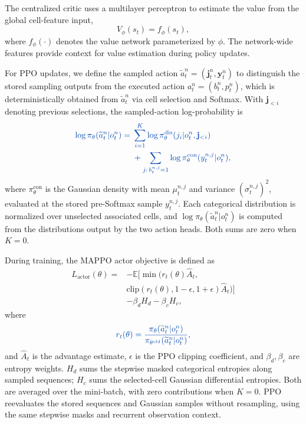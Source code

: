 \documentclass[journal]{IEEEtran}
\newcommand{\revbegin}[1]{\color{revisionblue}\ignorespaces}
\newcommand{\revend}[1]{\color{black}\ignorespaces}
\begin{document}
\revbegin{}The centralized critic uses a multilayer perceptron to estimate the value from the global cell-feature input,\revend{}
\begin{equation}
V_\phi(s_t)=f_\phi(s_t),
\end{equation}
\revbegin{}where $f_\phi(\cdot)$ denotes the value network parameterized by $\phi$. The network-wide features provide context for value estimation during policy updates.\revend{}

\revbegin{}For PPO updates, we define the sampled action $\widetilde a_t^n=(\mathbf j_t^n,\mathbf y_t^n)$ to distinguish the stored sampling outputs from the executed action $a_t^n=(b_t^n,p_t^n)$, which is deterministically obtained from $\widetilde a_t^n$ via cell selection and Softmax. With $\mathbf j_{<i}$ denoting previous selections, the sampled-action log-probability is\revend{}
\begin{equation}\color{revisionblue}
\begin{aligned}
\log\pi_{\theta}(\widetilde a_t^n|o_t^n)
={}&\sum_{i=1}^{K}\log\pi_{\theta}^{\mathrm{dis}}(j_i|o_t^n,\mathbf j_{<i})\\
&+\sum_{j:\,b_t^{n,j}=1}\log\pi_{\theta}^{\mathrm{con}}(y_t^{n,j}|o_t^n),
\end{aligned}
\label{eq:mappo-joint-logprob}
\end{equation}
\revbegin{}where $\pi_{\theta}^{\mathrm{con}}$ is the Gaussian density with mean $\mu_t^{n,j}$ and variance $(\sigma_t^{n,j})^2$, evaluated at the stored pre-Softmax sample $y_t^{n,j}$. Each categorical distribution is normalized over unselected associated cells, and $\log\pi_{\theta}(\widetilde a_t^n|o_t^n)$ is computed from the distributions output by the two action heads. Both sums are zero when $K=0$.\revend{}

During training, the MAPPO actor objective is defined as
\begin{equation}
\begin{aligned}
L_{\mathrm{actor}}(\theta)={}&-\mathbb E\Big[
\min\big(r_t(\theta)\hat A_t,\\
&\mathrm{clip}(r_t(\theta),1-\epsilon,1+\epsilon)\hat A_t\big)
\Big]\\
&-\beta_d H_d-\beta_c H_c,
\end{aligned}
\label{eq:mappo-actor-loss}
\end{equation}
where
\begin{equation}\color{revisionblue}
r_t(\theta)=
\frac{\pi_{\theta}(\widetilde a_t^n|o_t^n)}
{\pi_{\theta^{\mathrm{old}}}(\widetilde a_t^n|o_t^n)},
\end{equation}
\revbegin{}and $\hat A_t$ is the advantage estimate, $\epsilon$ is the PPO clipping coefficient, and $\beta_d,\beta_c$ are entropy weights. $H_d$ sums the stepwise masked categorical entropies along sampled sequences; $H_c$ sums the selected-cell Gaussian differential entropies. Both are averaged over the mini-batch, with zero contributions when $K=0$. PPO reevaluates the stored sequences and Gaussian samples without resampling, using the same stepwise masks and recurrent observation context.\revend{}
\end{document}
